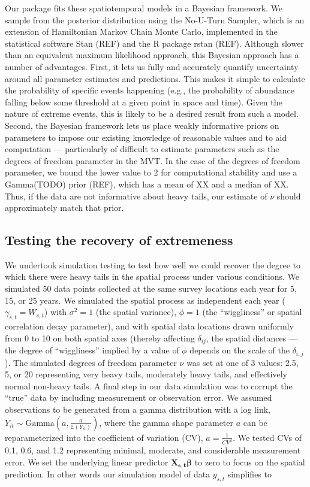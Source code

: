 \documentclass[12pt,english]{article}
\begin{document}
\begin{spacing}{1.25}
Our package fits these spatiotemporal models in a Bayesian framework. We sample
from the posterior distribution using the No-U-Turn Sampler, which is an
extension of Hamiltonian Markov Chain Monte Carlo, implemented in the
statistical software Stan (REF) and the R package rstan (REF). Although slower
than an equivalent maximum likelihood approach, this Bayesian approach has a
number of advantages. First, it lets us fully and accurately quantify
uncertainty around all parameter estimates and predictions. This makes it
simple to calculate the probability of specific events happening (e.g., the
probability of abundance falling below some threshold at a given point in space
and time). Given the nature of extreme events, this is likely to be a desired
result from such a model. Second, the Bayesian framework lets us place weakly
informative priors on parameters to impose our existing knowledge of reasonable
values and to aid computation --- particularly of difficult to estimate
parameters such as the degrees of freedom parameter in the MVT. In the case of
the degrees of freedom parameter, we bound the lower value to $2$ for
computational stability and use a Gamma(TODO) prior (REF), which has a mean of
XX and a median of XX. Thus, if the data are not informative about heavy
tails, our estimate of $\nu$ should approximately match that prior. 

\subsection{Testing the recovery of extremeness}

We undertook simulation testing to test how well we could recover the degree to
which there were heavy tails in the spatial process under various conditions.
We simulated 50 data points collected at the same survey locations each year
for 5, 15, or 25 years. We simulated the spatial process as independent each
year ($\gamma_{s,t} = W_{s,t}$) with $\sigma^2 = 1$ (the spatial variance),
$\phi = 1$ (the ``wiggliness'' or spatial correlation decay parameter), and
with spatial data locations drawn uniformly from 0 to 10 on both spatial axes
(thereby affecting $\delta_{ij}$, the spatial distances --- the degree of
``wiggliness'' implied by a value of $\phi$ depends on the scale of the
$\delta_{i,j}$). The simulated degrees of freedom parameter $\nu$ was set at
one of 3 values: 2.5, 5, or 20 representing very heavy tails, moderately heavy
tails, and effectively normal non-heavy tails. A final step in our data
simulation was to corrupt the ``true'' data by including measurement or
observation error. We assumed observations to be generated from a gamma
distribution with a log link, $Y_{it}\sim \mathrm{Gamma}\left(a,\frac
  {a}{\mathbb{E}(Y_{it})} \right)$, where the gamma shape parameter $a$ can be
reparameterized into the coefficient of variation (CV), $a=\frac{1}{CV^2}$. We
tested CVs of 0.1, 0.6, and 1.2 representing minimal, moderate, and
considerable measurement error. We set the underlying linear predictor
$\bm{X_{s,t}} \bm{\beta}$ to zero to focus on the spatial prediction. In other
words our simulation model of data $y_{s,t}$ simplifies to


\end{spacing}
\end{document}
